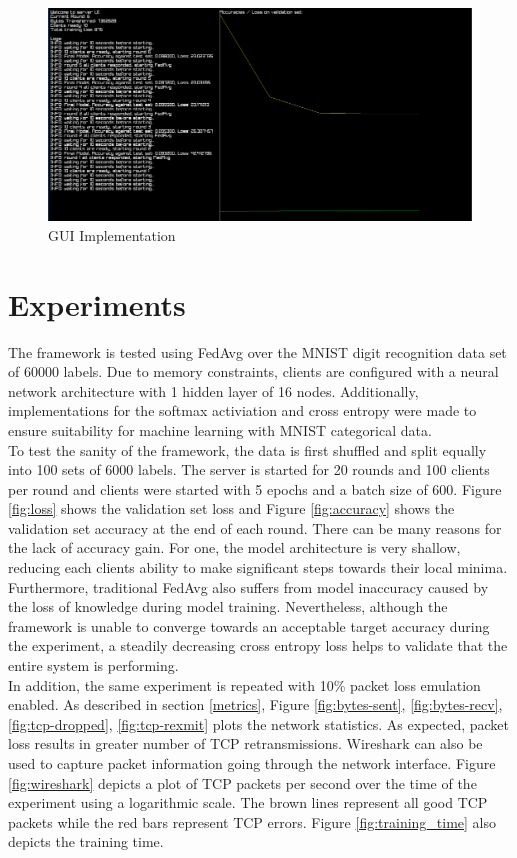 \documentclass[12pt]{article}
\begin{document}
\begin{figure}
  \includegraphics[scale=0.3]{gui}
  \caption{GUI Implementation}
  \label{fig:gui}
\centering
\end{figure}

\pagebreak
\section{Experiments}\label{experiments}
The framework is tested using FedAvg over the MNIST digit recognition data set of 60000 labels. Due to memory
constraints, clients are configured with a neural network architecture with 1 hidden layer of 16
nodes. Additionally, implementations for the softmax activiation and cross entropy were made to
ensure suitability for machine learning with MNIST categorical data.\\

To test the sanity of the framework, the data is first shuffled and split equally into 100 sets of 6000 labels.
The server is started for 20 rounds and 100 clients per round and clients were started with 5 epochs and a batch size of 600.
Figure \ref{fig:loss} shows the validation set loss and Figure \ref{fig:accuracy} shows the
validation set accuracy at the end of each round. There can be many reasons for the lack of
accuracy gain. For one, the model architecture is very shallow, reducing each clients ability to
make significant steps towards their local minima. Furthermore, traditional FedAvg also suffers from
model inaccuracy caused by the loss of knowledge during model training\cite{hinton2015distilling}. Nevertheless, although the framework is unable to converge
towards an acceptable target accuracy during the experiment, a steadily decreasing cross entropy
loss helps to validate that the entire system is performing. \\

In addition, the same experiment is repeated with 10\% packet loss emulation enabled. As described in section \ref{metrics}, Figure \ref{fig:bytes-sent}, \ref{fig:bytes-recv},
\ref{fig:tcp-dropped}, \ref{fig:tcp-rexmit} plots the network statistics. As expected, packet loss
results in greater number of TCP retransmissions. Wireshark\cite{wireshark} can also
be used to capture packet information going through the network interface. Figure
\ref{fig:wireshark} depicts a plot of TCP packets per second over the time of the experiment using a
logarithmic scale. The brown lines represent all good TCP packets while the red bars represent TCP
errors. Figure \ref{fig:training_time} also depicts the training time.
\end{document}
